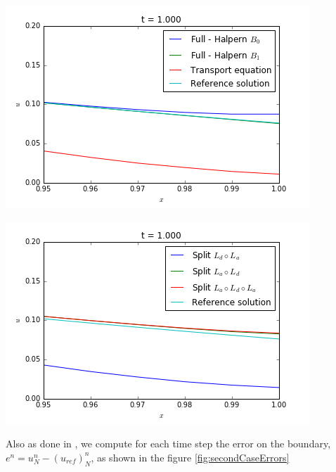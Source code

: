\begin{minipage}{\textwidth}
\begin{minipage}{.5\linewidth}
	\end{minipage}
	\begin{minipage}{.5\textwidth} 
		\includegraphics[scale=.48]{figures/secondCase1ADetail.png}	
	\end{minipage}
	\begin{minipage}{.5\linewidth}
		\includegraphics[scale=.48]{figures/secondCase1BDetail.png}	
	\end{minipage}
\end{minipage}

\indent Also as done in \cite{halpern1986}, we compute for each time step the error on the boundary, $e^n = u^n_N - (u_{ref})^n_N$, as shown in the figure \ref{fig:secondCaseErrors}

